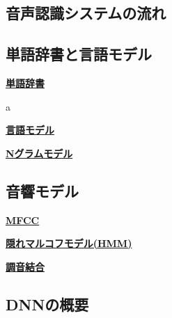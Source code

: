 \subsection{音声認識システムの流れ}

\subsection{単語辞書と言語モデル}
\textbf{\underline{単語辞書}}\par
a
\par\textbf{\underline{言語モデル}}\par
\par\textbf{\underline{Nグラムモデル}}\par

\subsection{音響モデル}
\par\textbf{\underline{MFCC}}\par
\par\textbf{\underline{隠れマルコフモデル(HMM)}}\par
\par\textbf{\underline{調音結合}}\par

\subsection{DNNの概要}
